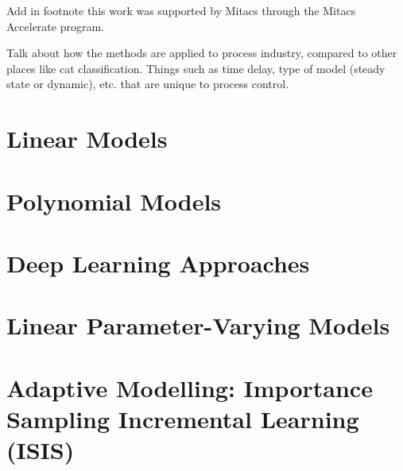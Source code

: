 %
% 

Add in footnote this work was supported by Mitacs through the Mitacs Accelerate program.

Talk about how the methods are applied to process industry, compared to other places like cat classification.  Things such as time delay, type of model (steady state or dynamic), etc. that are unique to process control.

\section{Linear Models}

\section{Polynomial Models}

\section{Deep Learning Approaches}

\section{Linear Parameter-Varying Models}

\section{Adaptive Modelling: Importance Sampling Incremental Learning (ISIS)}
